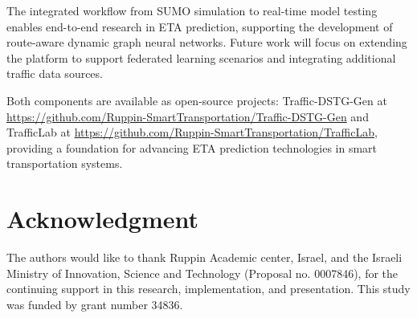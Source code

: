 \documentclass[conference]{IEEEtran}
\begin{document}
The integrated workflow from SUMO simulation to real-time model testing enables end-to-end research in ETA prediction, supporting the development of route-aware dynamic graph neural networks. Future work will focus on extending the platform to support federated learning scenarios and integrating additional traffic data sources.

Both components are available as open-source projects: Traffic-DSTG-Gen at \url{https://github.com/Ruppin-SmartTransportation/Traffic-DSTG-Gen} and TrafficLab at \url{https://github.com/Ruppin-SmartTransportation/TrafficLab}, providing a foundation for advancing ETA prediction technologies in smart transportation systems.

\section*{Acknowledgment}

The authors would like to thank Ruppin Academic center, Israel, and the Israeli Ministry of Innovation, Science and Technology (Proposal no. 0007846), for the continuing support in this research, implementation, and presentation. This study was funded by grant number 34836.
\end{document}
